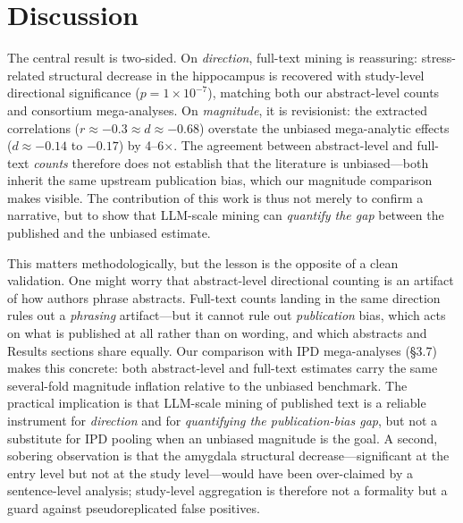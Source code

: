 \documentclass[11pt]{article}
\begin{document}
\section{Discussion}

The central result is two-sided. On \emph{direction}, full-text mining is
reassuring: stress-related structural decrease in the hippocampus is recovered
with study-level directional significance ($p=1\times10^{-7}$), matching both our
abstract-level counts and consortium mega-analyses. On \emph{magnitude}, it is
revisionist: the extracted correlations ($r\approx-0.3 \approx d\approx-0.68$)
overstate the unbiased mega-analytic effects ($d\approx-0.14$ to $-0.17$) by
4--6$\times$. The agreement between abstract-level and full-text \emph{counts}
therefore does not establish that the literature is unbiased---both inherit the
same upstream publication bias, which our magnitude comparison makes visible. The
contribution of this work is thus not merely to confirm a narrative, but to show
that LLM-scale mining can \emph{quantify the gap} between the published and the
unbiased estimate.

This matters methodologically, but the lesson is the opposite of a clean
validation. One might worry that abstract-level directional counting is an
artifact of how authors phrase abstracts. Full-text counts landing in the same
direction rules out a \emph{phrasing} artifact---but it cannot rule out
\emph{publication} bias, which acts on what is published at all rather than on
wording, and which abstracts and Results sections share equally. Our comparison
with IPD mega-analyses (\S3.7) makes this concrete: both abstract-level and
full-text estimates carry the same several-fold magnitude inflation relative to
the unbiased benchmark. The practical implication is that LLM-scale mining of
published text is a reliable instrument for \emph{direction} and for
\emph{quantifying the publication-bias gap}, but not a substitute for IPD pooling
when an unbiased magnitude is the goal. A second, sobering observation is that
the amygdala structural decrease---significant at the entry level but not at the
study level---would have been over-claimed by a sentence-level analysis;
study-level aggregation is therefore not a formality but a guard against
pseudoreplicated false positives.
\end{document}
